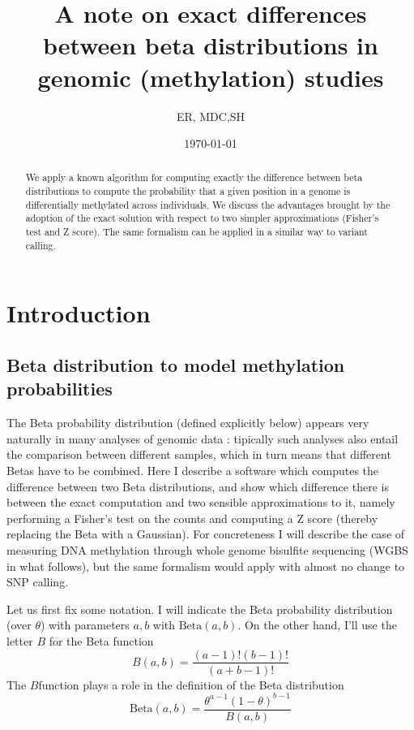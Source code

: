 \documentclass[11pt]{amsart}
\title{A note on exact differences between beta distributions in genomic (methylation) studies}
\author{ER, MDC,SH}
\date{\today}
\begin{document}
\begin{abstract}
We apply a known algorithm for computing exactly the difference between beta distributions
to compute the probability that a given position in a genome is differentially methylated across
individuals. We discuss the advantages brought by the adoption of the exact solution
with respect to two simpler approximations (Fisher's test and Z score).
The same formalism can be applied in a similar way to variant calling.
\end{abstract}
\maketitle
\section{Introduction}
\subsection{Beta distribution to model methylation probabilities}
The Beta probability distribution (defined explicitly below)  appears very naturally in many analyses of genomic data : tipically such analyses also entail the comparison between different samples, which in turn means that different Betas have to be combined. Here I describe a software which computes the difference between two Beta distributions, and show which difference there is between the exact computation and two sensible approximations to it, namely performing a Fisher's test on the counts and computing a Z score (thereby replacing the Beta with a Gaussian). For concreteness I will describe the case of measuring DNA methylation through whole genome bisulfite sequencing (WGBS in what follows), but the same formalism would apply with almost no change to SNP calling. 

Let us first fix some notation. I will indicate the Beta probability distribution (over $\theta$) with parameters $a,b$ with $\mbox{Beta}(a,b)$. On the other hand, I'll use the letter $B$ for the Beta function 
\[B(a,b)=\frac{(a-1)!(b-1)!}{(a+b-1)!}\] The $B$function plays a role in the definition of the Beta distribution \[\mbox{Beta}(a,b)=\frac{\theta^{a-1}(1-\theta)^{b-1}}{B(a,b)}\]
 
\end{document}
